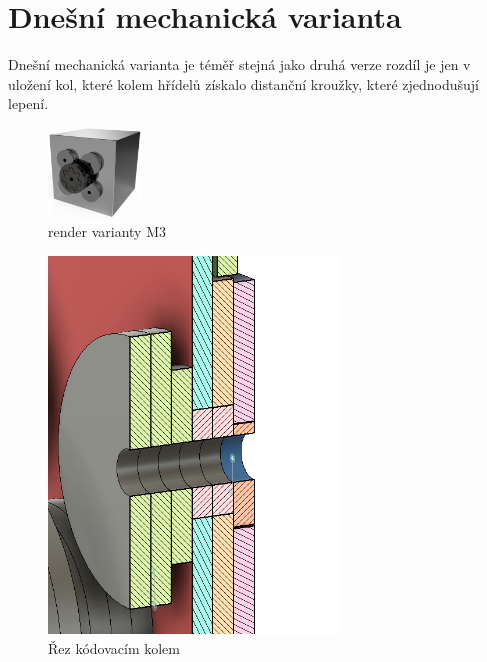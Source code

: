 \section{Dnešní mechanická varianta}

Dnešní mechanická varianta je téměř stejná jako druhá verze rozdíl je jen v uložení kol, které kolem hřídelů získalo distanční kroužky, které
zjednodušují lepení. 

\begin{figure}[htbp]
    \centering
    \includegraphics[width=70pt]{kapitoly/obrazky/M3/predni_render.png}
    \caption{render varianty M3}
    \label{fig:M3-render}
\end{figure}

\begin{figure}[htbp]
    \centering
    \includegraphics[width=220pt]{kapitoly/obrazky/M3/rez.png}
    \caption{Řez kódovacím kolem}
    \label{fig:M3-rez-kolem}
\end{figure}

\newpage